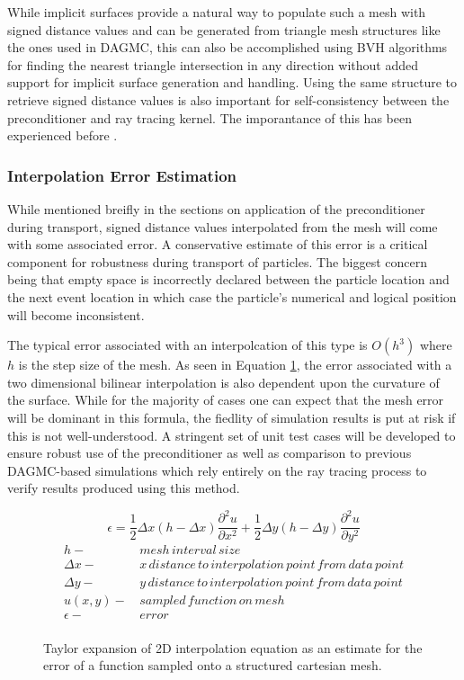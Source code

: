 \documentclass[12pt, a4paper]{article}
\begin{document}
While implicit surfaces provide a natural way to populate such a mesh with signed distance values and can be generated from triangle mesh structures like the ones used in DAGMC, this can also be accomplished using BVH algorithms for finding the nearest triangle intersection in any direction without added support for implicit surface generation and handling. Using the same structure to retrieve signed distance values is also important for self-consistency between the preconditioner and ray tracing kernel. The imporantance of this has been experienced before \cite{Smith_2011}.

\subsubsection{Interpolation Error Estimation}

While mentioned breifly in the sections on application of the preconditioner during transport, signed distance values interpolated from the mesh will come with some associated error. A conservative estimate of this error is a critical component for robustness during transport of particles. The biggest concern being that empty space is incorrectly declared between the particle location and the next event location in which case the particle's numerical and logical position will become inconsistent.

The typical error associated with an interpolcation of this type is $O(h^3)$ where $h$ is the step size of the mesh. As seen in Equation \ref{interpolation_err_2d}, the error associated with a two dimensional bilinear interpolation is also dependent upon the curvature of the surface. While for the majority of cases one can expect that the mesh error will be dominant in this formula, the fiedlity of simulation results is put at risk if this is not well-understood. A stringent set of unit test cases will be developed to ensure robust use of the preconditioner as well as comparison to previous DAGMC-based simulations which rely entirely on the ray tracing process to verify results produced using this method.

\begin{figure}[H]
  \begin{equation}
    \epsilon = \frac{1}{2} \Delta x (h-\Delta x) \frac{\partial^2 u}{\partial x^2} + \frac{1}{2} \Delta y (h-\Delta y)  \frac{\partial^2 u}{\partial y^2}
  \end{equation}
  \begin{align*}
    h - & \, mesh\, interval\, size \\
    \Delta x - & \, x\, distance\, to\, interpolation\, point\, from\, data\, point \\
    \Delta y - & \, y\, distance\, to\, interpolation\, point\, from\, data\, point \\
    u(x,y) - &\, sampled\, function\, on\, mesh \\
    \epsilon - & \, error \\
  \end{align*}
  \caption{Taylor expansion of 2D interpolation equation as an estimate for the error of a function sampled onto a structured cartesian mesh.}
  \label{interpolation_err_2d}
\end{figure}
\end{document}
